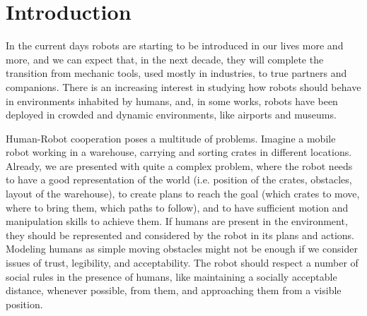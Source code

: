 


\chapter{Introduction} %

\label{chapter:introduction} %


In the current days robots are starting to be introduced in our lives more and more, and we can expect that, in the next decade, they will complete the transition from mechanic tools, used mostly in industries, to true partners and companions. There is an increasing interest in studying how robots should behave in environments inhabited by humans, and, in some works, robots have been deployed in crowded and dynamic environments, like airports and museums.

Human-Robot cooperation poses a multitude of problems. Imagine a mobile robot working in a warehouse, carrying and sorting crates in different locations. Already, we are presented with quite a complex problem, where the robot needs to have a good representation of the world (i.e. position of the crates, obstacles, layout of the warehouse), to create plans to reach the goal (which crates to move, where to bring them, which paths to follow), and to have sufficient motion and manipulation skills to achieve them. If humans are present in the environment, they should be represented and considered by the robot in its plans and actions.  Modeling humans as simple moving obstacles might not be enough if we consider issues of trust, legibility, and acceptability. The robot should respect a number of social rules in the presence of humans, like maintaining a socially acceptable distance, whenever possible, from them, and approaching them from a visible position.

